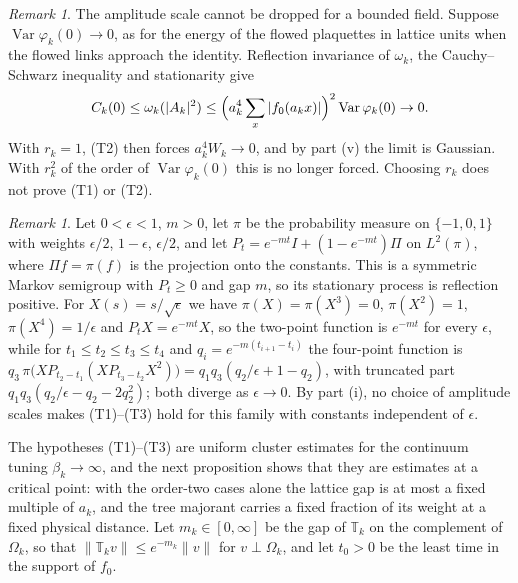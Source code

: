 \documentclass[aps,prd,twocolumn,superscriptaddress,nofootinbib,longbibliography,floatfix,amsmath,amssymb,10pt]{revtex4-2}
\theoremstyle{definition}
\theoremstyle{remark}
\newtheorem{remark}[theorem]{Remark}
\begin{document}
\begin{remark}\label{rem:amplitude}
The amplitude scale cannot be dropped for a bounded field. Suppose
$\operatorname{Var}\varphi_k(0)\to0$, as for the energy of the flowed
plaquettes in lattice units when the flowed links approach the identity.
Reflection invariance of $\omega_k$, the Cauchy--Schwarz inequality and
stationarity give
\[
C_k(0)\le\omega_k(|A_k|^2)\le\Bigl(a_k^4\sum_x|f_0(a_kx)|\Bigr)^2
\operatorname{Var}\varphi_k(0)\to0 .
\]
With $r_k=1$, (T2) then forces $a_k^4W_k\to0$, and by part (v) the limit is
Gaussian. With $r_k^2$ of the order of $\operatorname{Var}\varphi_k(0)$ this
is no longer forced. Choosing $r_k$ does not prove (T1) or (T2).
\end{remark}

\begin{remark}\label{rem:markov}
Let $0<\epsilon<1$, $m>0$, let $\pi$ be the probability measure on
$\{-1,0,1\}$ with weights $\epsilon/2$, $1-\epsilon$, $\epsilon/2$, and let
$P_t=e^{-mt}I+(1-e^{-mt})\Pi$ on $L^2(\pi)$, where $\Pi f=\pi(f)$ is the
projection onto the constants. This is a symmetric Markov semigroup with
$P_t\ge0$ and gap $m$, so its stationary process is reflection positive. For
$X(s)=s/\sqrt\epsilon$ we have $\pi(X)=\pi(X^3)=0$, $\pi(X^2)=1$,
$\pi(X^4)=1/\epsilon$ and $P_tX=e^{-mt}X$, so the two-point function is
$e^{-mt}$ for every $\epsilon$, while for $t_1\le t_2\le t_3\le t_4$ and
$q_i=e^{-m(t_{i+1}-t_i)}$ the four-point function is
$q_3\,\pi\bigl(XP_{t_2-t_1}(XP_{t_3-t_2}X^2)\bigr)=q_1q_3(q_2/\epsilon+1-q_2)$,
with truncated part $q_1q_3(q_2/\epsilon-q_2-2q_2^2)$; both diverge as
$\epsilon\to0$. By part (i), no choice of amplitude scales makes
(T1)--(T3) hold for this family with constants independent of $\epsilon$.
\end{remark}

The hypotheses (T1)--(T3) are uniform cluster estimates for the continuum
tuning $\beta_k\to\infty$, and the next proposition shows that they are
estimates at a critical point: with the order-two cases alone the lattice
gap is at most a fixed multiple of $a_k$, and the tree majorant carries a fixed fraction
of its weight at a fixed physical distance. Let $m_k\in[0,\infty]$ be the
gap of $\mathbb T_k$ on the complement of $\Omega_k$, so that
$\|\mathbb T_kv\|\le e^{-m_k}\|v\|$ for $v\perp\Omega_k$, and let $t_0>0$ be
the least time in the support of $f_0$.
\end{document}
